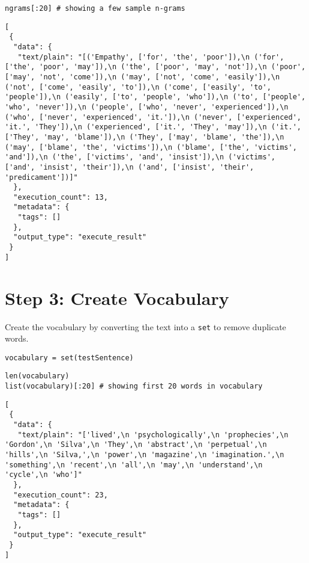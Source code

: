 \documentclass[
]{article}
\begin{document}
\begin{verbatim}
ngrams[:20] # showing a few sample n-grams
\end{verbatim}

\begin{verbatim}
[
 {
  "data": {
   "text/plain": "[('Empathy', ['for', 'the', 'poor']),\n ('for', ['the', 'poor', 'may']),\n ('the', ['poor', 'may', 'not']),\n ('poor', ['may', 'not', 'come']),\n ('may', ['not', 'come', 'easily']),\n ('not', ['come', 'easily', 'to']),\n ('come', ['easily', 'to', 'people']),\n ('easily', ['to', 'people', 'who']),\n ('to', ['people', 'who', 'never']),\n ('people', ['who', 'never', 'experienced']),\n ('who', ['never', 'experienced', 'it.']),\n ('never', ['experienced', 'it.', 'They']),\n ('experienced', ['it.', 'They', 'may']),\n ('it.', ['They', 'may', 'blame']),\n ('They', ['may', 'blame', 'the']),\n ('may', ['blame', 'the', 'victims']),\n ('blame', ['the', 'victims', 'and']),\n ('the', ['victims', 'and', 'insist']),\n ('victims', ['and', 'insist', 'their']),\n ('and', ['insist', 'their', 'predicament'])]"
  },
  "execution_count": 13,
  "metadata": {
   "tags": []
  },
  "output_type": "execute_result"
 }
]
\end{verbatim}

\hypertarget{step-3-create-vocabulary}{%
\section{Step 3: Create Vocabulary}\label{step-3-create-vocabulary}}

Create the vocabulary by converting the text into a
\texttt{set} to remove duplicate words.

\begin{verbatim}
vocabulary = set(testSentence)
\end{verbatim}

\begin{verbatim}
len(vocabulary)
list(vocabulary)[:20] # showing first 20 words in vocabulary
\end{verbatim}

\begin{verbatim}
[
 {
  "data": {
   "text/plain": "['lived',\n 'psychologically',\n 'prophecies',\n 'Gordon',\n 'Silva',\n 'They',\n 'abstract',\n 'perpetual',\n 'hills',\n 'Silva,',\n 'power',\n 'magazine',\n 'imagination.',\n 'something',\n 'recent',\n 'all',\n 'may',\n 'understand',\n 'cycle',\n 'who']"
  },
  "execution_count": 23,
  "metadata": {
   "tags": []
  },
  "output_type": "execute_result"
 }
]
\end{verbatim}
\end{document}
